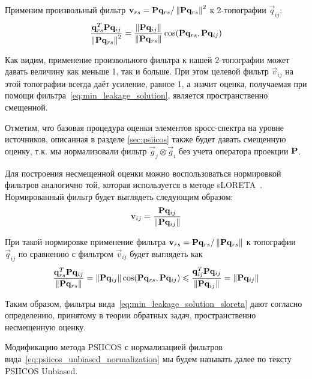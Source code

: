 Применим произвольный фильтр $\mathbf{v}_{rs} = \mathbf{P} \mathbf{q}_{rs} / \left\lVert\mathbf{P} \mathbf{q}_{rs}\right\rVert^2$ к
2-топографии $\vec{q}_{ij}$:
\begin{equation}
    \frac{\mathbf{q}_{rs}^T\mathbf{P} \mathbf{q}_{ij}}{\left\lVert\mathbf{P}\mathbf{q}_{rs}\right\rVert^2} =
    \frac{
        \left\lVert\mathbf{P} \mathbf{q}_{ij}\right\rVert
    }{
        \left\lVert\mathbf{P}\mathbf{q}_{rs}\right\rVert
    }
    \cos(\mathbf{P}\mathbf{q}_{rs}, \mathbf{P} \mathbf{q}_{ij})
\end{equation}

Как видим, применение произвольного фильтра к нашей 2-топографии может давать
величину как меньше 1, так и больше.  При этом целевой фильтр $\vec{v}_{ij}$ на
этой топографии всегда даёт усиление, равное 1, а значит оценка, получаемая при
помощи фильтра~\ref{eq:min_leakage_solution}, является пространственно
смещенной.

Отметим, что базовая процедура оценки элементов кросс-спектра на уровне источников, описанная в разделе
\ref{sec:psiicos} также будет давать смещенную оценку, т.к. мы нормализовали
фильтр $\vec{g}_j \otimes \vec{g}_i$ без учета оператора проекции $\mathbf{P}$.

Для построения несмещенной оценки можно воспользоваться нормировкой фильтров аналогично той, которая
используется в методе sLORETA~\cite{Pascual-Marqui2002}. Нормированный фильтр будет выглядеть следующим образом:
\begin{equation}
    \mathbf{v}_{ij} = \frac{\mathbf{P} \mathbf{q}_{ij}}{\left\lVert\mathbf{P} \mathbf{q}_{ij}\right\rVert}
    \label{eq:min_leakage_solution_sloreta}
\end{equation}

При такой нормировке применение фильтра $\mathbf{v}_{rs} = \mathbf{P} \mathbf{q}_{rs} / \left\lVert\mathbf{P} \mathbf{q}_{rs}\right\rVert$
к топографии $\vec{q}_{ij}$ по сравнению с фильтром $\vec{v}_{ij}$ будет выглядеть как
\begin{equation}
    \frac{\mathbf{q}_{rs}^T\mathbf{P} \mathbf{q}_{ij}}{\left\lVert\mathbf{P}\mathbf{q}_{rs}\right\rVert} =
    \left\lVert\mathbf{P} \mathbf{q}_{ij}\right\rVert \cos(\mathbf{P}\mathbf{q}_{rs}, \mathbf{P} \mathbf{q}_{ij}) \leqslant
    \frac{\mathbf{q}_{ij}^T\mathbf{P} \mathbf{q}_{ij}}{\left\lVert\mathbf{P}\mathbf{q}_{ij}\right\rVert} =
    \left\lVert\mathbf{P} \mathbf{q}_{ij}\right\rVert
    \label{eq:psiicos_unbiased_normalization}
\end{equation}

Таким образом, фильтры вида~\ref{eq:min_leakage_solution_sloreta} дают согласно
определению, принятому в теории обратных задач, пространственно несмещенную
оценку.

Модификацию метода PSIICOS с нормализацией фильтров вида~\ref{eq:psiicos_unbiased_normalization}
мы будем называть далее по тексту PSIICOS Unbiased.

